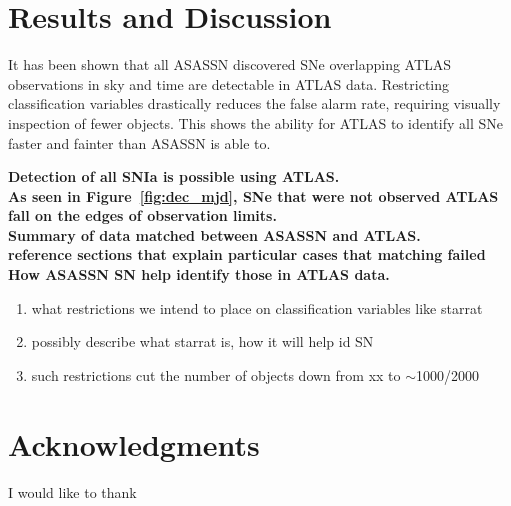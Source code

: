 \documentclass[aps,prb,twocolumn,superscriptaddress]{revtex4-1}
\begin{document}
\section{Results and Discussion}
\indent It has been shown that all ASASSN discovered SNe overlapping ATLAS 
observations in sky and time are detectable in ATLAS data. Restricting 
classification variables drastically reduces the false alarm rate, requiring 
visually inspection of fewer objects. This shows the ability for ATLAS to 
identify all SNe faster and fainter than ASASSN is able to.

{\bf Detection of all SNIa is possible using ATLAS.\\}
{\bf As seen in Figure~\ref{fig:dec_mjd}, SNe that were not 
observed ATLAS fall on the edges of observation limits.\\}
{\bf Summary of data matched between ASASSN and ATLAS.\\
reference sections that explain particular cases that matching failed}
{\bf How ASASSN SN help identify those in ATLAS data.}
\begin{enumerate}
	\item{} what restrictions we intend to place on classification variables like starrat
	\item{} possibly describe what starrat is, how it will help id SN
	\item{} such restrictions cut the number of objects down from xx to $\sim$1000/2000
\end{enumerate}


\section*{Acknowledgments}
I would like to thank   %
\end{document}
